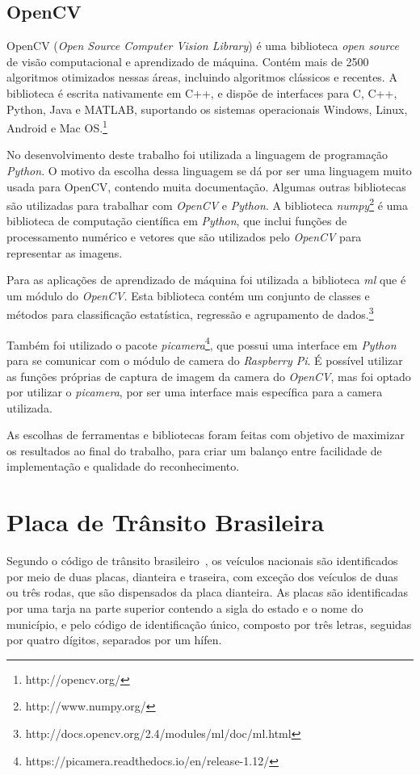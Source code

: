 \subsection{OpenCV}
\label{sec:opencv}

OpenCV (\emph{Open Source Computer Vision Library}) é uma biblioteca \emph{open
source} de visão computacional e aprendizado de máquina. Contém mais de 2500
algoritmos otimizados nessas áreas, incluindo algoritmos clássicos e recentes. A biblioteca é escrita nativamente em C++, e dispõe de interfaces para C, C++,
Python, Java e MATLAB, suportando os sistemas operacionais Windows, Linux,
Android e Mac OS.\footnote{http://opencv.org/}

No desenvolvimento deste trabalho foi utilizada a linguagem de programação \emph{Python}. O motivo da escolha dessa linguagem se dá por ser uma linguagem muito usada para OpenCV\@, contendo muita documentação. Algumas outras bibliotecas são utilizadas para trabalhar com \emph{OpenCV} e \emph{Python}. A biblioteca \emph{numpy}\footnote{http://www.numpy.org/} é uma biblioteca de computação científica em \emph{Python}, que inclui funções de processamento numérico e vetores que são utilizados pelo \emph{OpenCV} para representar as imagens. 

Para as aplicações de aprendizado de máquina foi utilizada a biblioteca \emph{ml} que é um módulo do \emph{OpenCV}. Esta biblioteca contém um conjunto de classes e métodos para classificação estatística, regressão e agrupamento de dados.\footnote{http://docs.opencv.org/2.4/modules/ml/doc/ml.html}

Também foi utilizado o pacote \emph{picamera}\footnote{https://picamera.readthedocs.io/en/release-1.12/},
que possui uma interface em \emph{Python} para se comunicar com o módulo de camera do \emph{Raspberry Pi}.
É possível utilizar as funções próprias de captura de imagem da camera do \emph{OpenCV}, mas foi optado por utilizar o \emph{picamera}, por ser uma interface mais específica para a camera utilizada.

As escolhas de ferramentas e bibliotecas foram feitas
com objetivo de maximizar os resultados ao final do trabalho, para criar
um balanço entre facilidade de implementação e qualidade do reconhecimento.

\section{Placa de Trânsito Brasileira}
\label{sec:placabr}

Segundo o código de trânsito brasileiro~\cite{brasil1997lei}, os veículos
nacionais são identificados por meio de duas placas, dianteira e traseira, com
exceção dos veículos de duas ou três rodas, que são dispensados da placa
dianteira. As placas são identificadas por uma tarja na parte superior contendo
a sigla do estado e o nome do município, e pelo código de identificação único,
composto por três letras, seguidas por quatro dígitos, separados por um hífen.

